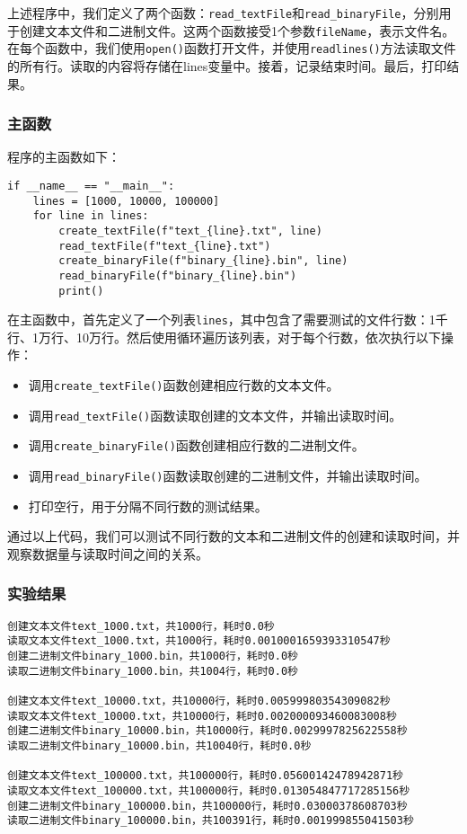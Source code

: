 \documentclass[lang=cn,11pt,a4paper]{elegantpaper}
\begin{document}
上述程序中，我们定义了两个函数：\lstinline{read_textFile}和\lstinline{read_binaryFile}，分别用于创建文本文件和二进制文件。这两个函数接受1个参数\lstinline{fileName}，表示文件名。在每个函数中，我们使用\lstinline{open()}函数打开文件，并使用\lstinline{readlines()}方法读取文件的所有行。读取的内容将存储在lines变量中。接着，记录结束时间。最后，打印结果。

\subsubsection{主函数}

程序的主函数如下：
\begin{lstlisting}
if __name__ == "__main__":
    lines = [1000, 10000, 100000]
    for line in lines:
        create_textFile(f"text_{line}.txt", line)
        read_textFile(f"text_{line}.txt")
        create_binaryFile(f"binary_{line}.bin", line)
        read_binaryFile(f"binary_{line}.bin")
        print()
\end{lstlisting}

在主函数中，首先定义了一个列表\lstinline{lines}，其中包含了需要测试的文件行数：1千行、1万行、10万行。然后使用循环遍历该列表，对于每个行数，依次执行以下操作：
\begin{itemize}
    \item 调用\lstinline{create_textFile()}函数创建相应行数的文本文件。
    \item 调用\lstinline{read_textFile()}函数读取创建的文本文件，并输出读取时间。
    \item 调用\lstinline{create_binaryFile()}函数创建相应行数的二进制文件。
    \item 调用\lstinline{read_binaryFile()}函数读取创建的二进制文件，并输出读取时间。
    \item 打印空行，用于分隔不同行数的测试结果。
\end{itemize}

通过以上代码，我们可以测试不同行数的文本和二进制文件的创建和读取时间，并观察数据量与读取时间之间的关系。

\subsubsection{实验结果}
\begin{lstlisting}[language=text]
创建文本文件text_1000.txt，共1000行，耗时0.0秒
读取文本文件text_1000.txt，共1000行，耗时0.0010001659393310547秒
创建二进制文件binary_1000.bin，共1000行，耗时0.0秒
读取二进制文件binary_1000.bin，共1004行，耗时0.0秒

创建文本文件text_10000.txt，共10000行，耗时0.00599980354309082秒
读取文本文件text_10000.txt，共10000行，耗时0.002000093460083008秒
创建二进制文件binary_10000.bin，共10000行，耗时0.0029997825622558秒
读取二进制文件binary_10000.bin，共10040行，耗时0.0秒

创建文本文件text_100000.txt，共100000行，耗时0.05600142478942871秒
读取文本文件text_100000.txt，共100000行，耗时0.013054847717285156秒
创建二进制文件binary_100000.bin，共100000行，耗时0.03000378608703秒
读取二进制文件binary_100000.bin，共100391行，耗时0.001999855041503秒
\end{lstlisting}
\end{document}
